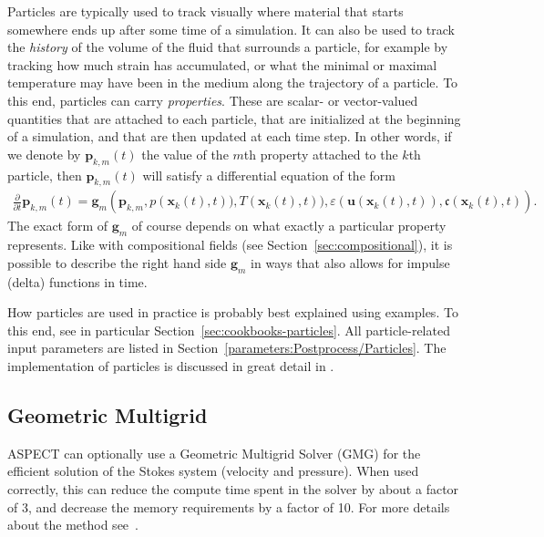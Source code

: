 \documentclass{article}
\newcommand{\aspect}{\textsc{ASPECT}}
\begin{document}
Particles are typically used to track visually where material that starts
somewhere ends up after some time of a simulation. It can also be used to track
the \textit{history} of the volume of the fluid that surrounds a particle, for
example by tracking how much strain has accumulated, or what the minimal or maximal
temperature may have been in the medium along the trajectory of a particle. To
this end, particles can carry \textit{properties}. These are scalar-
or vector-valued quantities that are attached to each particle, that are
initialized at the beginning of a simulation, and that are then updated at each time step. In other words, if we
denote by $\mathbf p_{k,m}(t)$ the value of the $m$th property attached to
the $k$th particle, then $\mathbf p_{k,m}(t)$ will satisfy a differential
equation of the form
\begin{align*}
  \frac{\partial}{\partial t} \mathbf p_{k,m}(t)
  = \mathbf g_m\left(\mathbf p_{k,m},
  p(\mathbf x_k(t),t)), T(\mathbf x_k(t),t)),
  \varepsilon(\mathbf u(\mathbf x_k(t),t)),
  \mathfrak c(\mathbf x_k(t),t)\right).
\end{align*}
The exact form of $\mathbf g_m$ of course depends on what exactly a particular
property represents. Like with compositional fields (see
Section~\ref{sec:compositional}), it is possible to describe the right hand side
$\mathbf g_m$ in ways that also allows for impulse (delta) functions in time.

How particles are used in practice is probably best explained using examples. To
this end, see in particular Section~\ref{sec:cookbooks-particles}. All
particle-related input parameters are listed in
Section~\ref{parameters:Postprocess/Particles}. The implementation of particles is
discussed in great detail in \cite{gassmoeller_particles}.



\subsection{Geometric Multigrid}
\label{sec:gmg}

\aspect{} can optionally use a Geometric Multigrid Solver (GMG) for the efficient solution
of the Stokes system (velocity and pressure). When used correctly, this can
reduce the compute time spent in the solver by about a factor of 3,
and decrease the memory requirements by a factor of 10.
For more details
about the method see~\cite{clevenger_stokes19,clevenger_par_gmg}.
\end{document}
